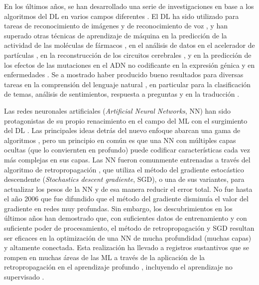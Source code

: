 En los últimos años, se han desarrollado una serie de investigaciones en base a los algoritmos del DL en varios campos diferentes \cite{LeCun2015}. El DL ha sido utilizado para tareas de reconocimiento de imágenes \cite{Krizhevsky2012, Farabet2013, Tompson2014, Szegedy2015} y de reconocimiento de voz \cite{Mikolov2011, Hinton2012, Sainath2013}, y han superado otras técnicas de aprendizaje de máquina en la predicción de la actividad de las moléculas de fármacos \cite{Ma2015}, en el análisis de datos en el acelerador de partículas \cite{Ciodaro2012, Claire2015}, en la reconstrucción de los circuitos cerebrales \cite{Helmstaedter2013}, y en la predicción de los efectos de las mutaciones en el ADN no codificante en la expresión génica y en enfermedades \cite{Leung2014, Xiong2015}. Se a mostrado haber producido bueno resultados para diversas tareas en la comprensión del lenguaje natural \cite{Collobert2011}, en particular para la clasificación de temas, análisis de sentimientos, respuesta a preguntas \cite{Bordes2014} y en la traducción \cite{Jean2014, Sutskever2014}.





Las redes neuronales artificiales ({\em Artificial Neural Networks}, NN) han sido protagonistas de su propio renacimiento en el campo del ML con el surgimiento del DL \cite{Bengio2006, Hinton2006, Le2012, Ranzato2007}. Las principales ideas detrás del nuevo enfoque abarcan una gama de algoritmos \cite{Bengio2007, Hinton2006}, pero un principio en común es que una NN con múltiples capas ocultas (que lo conviernten en profundo) puede codificar características cada vez más complejas en sus capas. Las NN fueron comunmente entrenadas a través del algoritmo de retropropagación \cite{Rumelhart1986b}, que utiliza el método del gradiente estocástico descendente ({\em Stochastics descent gradiente}, SGD), o una de sus variantes, para actualizar los pesos de la NN y de esa manera reducir el error total. No fue hasta el año 2006 que fue difundido que el método del gradiente disminuía el valor del gradiente en redes muy profundas. Sin embargo, los descubrimientos en los últimos años han demostrado que, con suficientes datos de entrenamiento y  con suficiente poder de procesamiento, el método de retropropagación y SGD resultan ser eficaces en la optimización de una NN de mucha profundidad (muchas capas) y altamente conectada\cite{Ciresan2012, He2015, Le2012}. Esta realización ha llevado a registros sustantivos que se rompen en muchas áreas de las ML a través de la aplicación de la retropropagación en el aprendizaje profundo \cite{Ciresan2012, He2015, Le2012}, incluyendo el aprendizaje no supervisado \cite{Bengio2009}.


